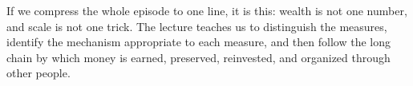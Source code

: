 If we compress the whole episode to one line, it is this: wealth is not one number, and scale is not one trick. The lecture teaches us to distinguish the measures, identify the mechanism appropriate to each measure, and then follow the long chain by which money is earned, preserved, reinvested, and organized through other people.